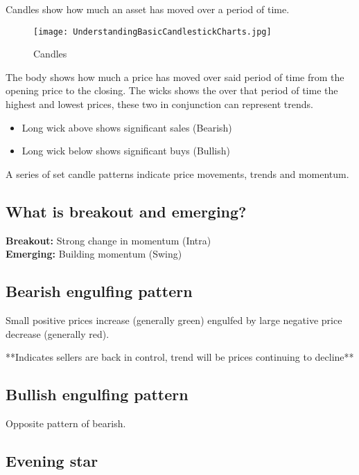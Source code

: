 \documentclass[11pt]{scrartcl} %
\begin{document}
Candles show how much an asset has moved over a period of time. 

\begin{figure}[t] %
	\centering
	\texttt{[image: UnderstandingBasicCandlestickCharts.jpg]} %
	\caption{Candles}
\end{figure}

The body shows how much a price has moved over said period of time from the opening price to the 
closing. The wicks shows the over that period of time the highest and lowest prices, 
these two in conjunction can represent trends.

\begin{itemize}
	\item Long wick above shows significant sales (Bearish)
	\item Long wick below shows significant buys (Bullish)
\end{itemize}

A series of set candle patterns indicate price movements, trends and momentum.

\subsection{What is breakout and emerging?}

\textbf{Breakout:} Strong change in momentum (Intra)\\
\textbf{Emerging:} Building momentum (Swing)

\subsection{Bearish engulfing pattern}

Small positive prices increase (generally green) engulfed by large negative price decrease 
(generally red). 

**Indicates sellers are back in control, trend will be prices continuing to decline**

\subsection{Bullish engulfing pattern}

Opposite pattern of bearish.

\subsection{Evening star} 
\end{document}
